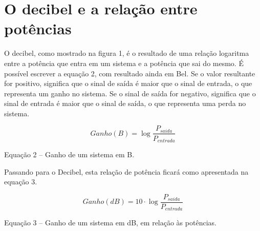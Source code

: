 \section{O decibel e a relação entre potências}
O decibel, como mostrado na figura 1, é o resultado de uma relação logaritma entre a potência que entra em um sistema e a potência que sai do mesmo. É possível escrever a equação 2, com resultado ainda em Bel. Se o valor resultante for positivo, significa que o sinal de saída é maior que o sinal de entrada, o que representa um ganho no sistema. Se o sinal de saída for negativo, significa que o sinal de entrada é maior que o sinal de saída, o que representa uma perda no sistema.

$$
    Ganho(B)= \log\frac{P_{saida}}{P_{entrada}}
$$
\begin{center}
    Equação 2 – Ganho de um sistema em B. 
\end{center} 


Passando para o Decibel, esta relação de potência ficará como apresentada na equação 3.

$$
    Ganho(dB)= 10 \cdot \log\frac{P_{saida}}{P_{entrada}}
$$

\begin{center}
Equação 3 – Ganho de um sistema em dB, em relação às potências.
\end{center} 